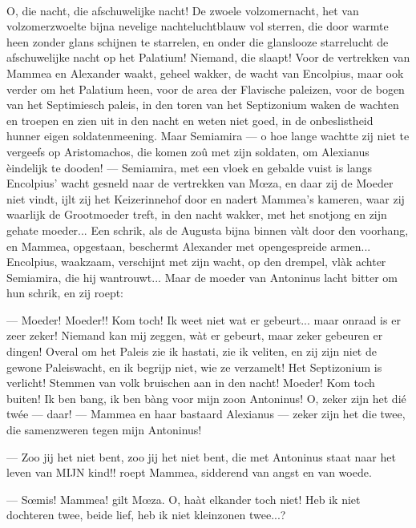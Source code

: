 \documentclass[a4paper, 12pt, oneside, dutch]{article}
\begin{document}
\paragraph{}
O, die nacht, die afschuwelijke nacht! De zwoele volzomernacht, het van volzomerzwoelte bijna nevelige nachteluchtblauw vol sterren, die door warmte heen zonder glans schijnen te starrelen, en onder die glanslooze starrelucht de afschuwelijke nacht op het Palatium! Niemand, die slaapt! Voor de vertrekken van Mammea en Alexander waakt, geheel wakker, de wacht van Encolpius, maar ook verder om het Palatium heen, voor de area der Flavische paleizen, voor de bogen van het Septimiesch paleis, in den toren van het Septizonium waken de wachten en troepen en zien uit in den nacht en weten niet goed, in de onbeslistheid hunner eigen soldatenmeening. Maar Semiamira --- o hoe lange wachtte zij niet te vergeefs op Aristomachos, die komen zoû met zijn soldaten, om Alexianus èindelijk te dooden! --- Semiamira, met een vloek en gebalde vuist is langs Encolpius' wacht gesneld naar de vertrekken van Mœza, en daar zij de Moeder niet vindt, ijlt zij het Keizerinnehof door en nadert Mammea's kameren, waar zij waarlijk de Grootmoeder treft, in den nacht wakker, met het snotjong en zijn gehate moeder... Een schrik, als de Augusta bijna binnen vàlt door den voorhang, en Mammea, opgestaan, beschermt Alexander met opengespreide armen... Encolpius, waakzaam, verschijnt met zijn wacht, op den drempel, vlàk achter Semiamira, die hij wantrouwt... Maar de moeder van Antoninus lacht bitter om hun schrik, en zij roept:

--- Moeder! Moeder!! Kom toch! Ik weet niet wat er gebeurt... maar onraad is er zeer zeker! Niemand kan mij zeggen, wàt er gebeurt, maar zeker gebeuren er dingen! Overal om het Paleis zie ik hastati, zie ik veliten, en zij zijn niet de gewone Paleiswacht, en ik begrijp niet, wie ze verzamelt! Het Septizonium is verlicht! Stemmen van volk bruischen aan in den nacht! Moeder! Kom toch buiten! Ik ben bang, ik ben bàng voor mijn zoon Antoninus! O, zeker zijn het dié twée --- daar! --- Mammea en haar bastaard Alexianus --- zeker zijn het die twee, die samenzweren tegen mijn Antoninus!

--- Zoo jij het niet bent, zoo jij het niet bent, die met Antoninus staat naar het leven van MIJN kind!! roept Mammea, sidderend van angst en van woede.

--- Sœmis! Mammea! gilt Mœza. O, haàt elkander toch niet! Heb ik niet dochteren twee, beide lief, heb ik niet kleinzonen twee...?
\end{document}
